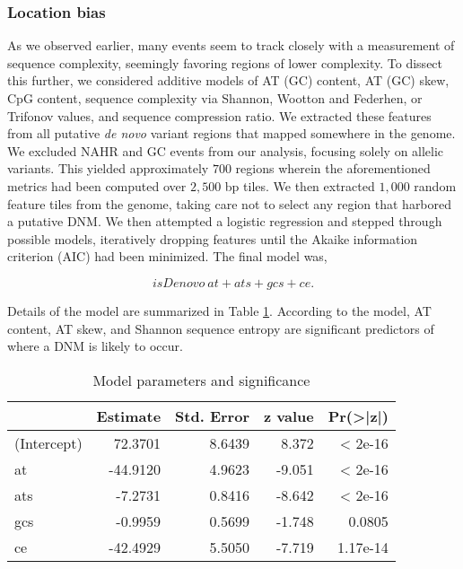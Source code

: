 \subsubsection{Location bias}

As we observed earlier, many events seem to track closely with a measurement of sequence complexity, seemingly favoring regions of lower complexity.  To dissect this further, we considered additive models of AT (GC) content, AT (GC) skew, CpG content, sequence complexity via Shannon, Wootton and Federhen, or Trifonov values, and sequence compression ratio.  We extracted these features from all putative \textit{de novo} variant regions that mapped somewhere in the genome.  We excluded NAHR and GC events from our analysis, focusing solely on allelic variants.  This yielded approximately $700$ regions wherein the aforementioned metrics had been computed over $2,500$ bp tiles.  We then extracted $1,000$ random feature tiles from the genome, taking care not to select any region that harbored a putative DNM.  We then attempted a logistic regression and stepped through possible models, iteratively dropping features until the Akaike information criterion (AIC) had been minimized.  The final model was,

\begin{equation}
isDenovo ~ at + ats + gcs + ce .
\end{equation}

\noindent  Details of the model are summarized in Table \ref{tbl:variantTable}.  According to the model, AT content, AT skew, and Shannon sequence entropy are significant predictors of where a DNM is likely to occur.

\begin{table}[]
\centering
\caption{Model parameters and significance}
\label{tbl:variantTable}
\begin{tabular}{lrrrr}
\toprule
            & Estimate  & Std. Error & z value  & Pr(>|z|) \\
\midrule
(Intercept) &  72.3701  &  8.6439    & 8.372    & < 2e-16  \\
at          & -44.9120  &  4.9623    & -9.051   & < 2e-16  \\
ats         &  -7.2731  &  0.8416    & -8.642   & < 2e-16  \\
gcs         &  -0.9959  &  0.5699    & -1.748   & 0.0805   \\
ce          & -42.4929  &  5.5050    & -7.719   & 1.17e-14 \\
\bottomrule
\end{tabular}
\end{table}
